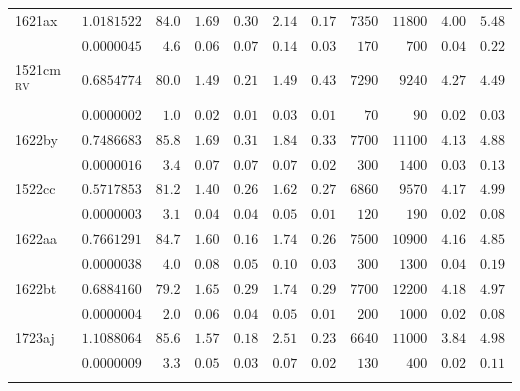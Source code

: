 \begin{table}
\begin{tabular}{@{}l *{10}{r} }
\noalign{\smallskip}
1621ax & $ 1.0181522$  & $      84.0$  & $      1.69$  & $      0.30$  & $      2.14$  & $      0.17$  & $7350$  & $11800$  & $      4.00$  & $      5.48$  \\
 & $ 0.0000045$  & $       4.6$  & $      0.06$  & $      0.07$  & $      0.14$  & $      0.03$  & $170$  & $700$  & $      0.04$  & $      0.22$  \\
\noalign{\smallskip}
1521cm$^\mathrm{RV}$ & $ 0.6854774$  & $      80.0$  & $      1.49$  & $      0.21$  & $      1.49$  & $      0.43$  & $7290$  & $9240$  & $      4.27$  & $      4.49$  \\
 & $ 0.0000002$  & $       1.0$  & $      0.02$  & $      0.01$  & $      0.03$  & $      0.01$  & $70$  & $90$  & $      0.02$  & $      0.03$  \\
\noalign{\smallskip}
1622by & $ 0.7486683$  & $      85.8$  & $      1.69$  & $      0.31$  & $      1.84$  & $      0.33$  & $7700$  & $11100$  & $      4.13$  & $      4.88$  \\
 & $ 0.0000016$  & $       3.4$  & $      0.07$  & $      0.07$  & $      0.07$  & $      0.02$  & $300$  & $1400$  & $      0.03$  & $      0.13$  \\
\noalign{\smallskip}
1522cc & $ 0.5717853$  & $      81.2$  & $      1.40$  & $      0.26$  & $      1.62$  & $      0.27$  & $6860$  & $9570$  & $      4.17$  & $      4.99$  \\
 & $ 0.0000003$  & $       3.1$  & $      0.04$  & $      0.04$  & $      0.05$  & $      0.01$  & $120$  & $190$  & $      0.02$  & $      0.08$  \\
\noalign{\smallskip}
1622aa & $ 0.7661291$  & $      84.7$  & $      1.60$  & $      0.16$  & $      1.74$  & $      0.26$  & $7500$  & $10900$  & $      4.16$  & $      4.85$  \\
 & $ 0.0000038$  & $       4.0$  & $      0.08$  & $      0.05$  & $      0.10$  & $      0.03$  & $300$  & $1300$  & $      0.04$  & $      0.19$  \\
\noalign{\smallskip}
1622bt & $ 0.6884160$  & $      79.2$  & $      1.65$  & $      0.29$  & $      1.74$  & $      0.29$  & $7700$  & $12200$  & $      4.18$  & $      4.97$  \\
 & $ 0.0000004$  & $       2.0$  & $      0.06$  & $      0.04$  & $      0.05$  & $      0.01$  & $200$  & $1000$  & $      0.02$  & $      0.08$  \\
\noalign{\smallskip}
1723aj & $ 1.1088064$  & $      85.6$  & $      1.57$  & $      0.18$  & $      2.51$  & $      0.23$  & $6640$  & $11000$  & $      3.84$  & $      4.98$  \\
 & $ 0.0000009$  & $       3.3$  & $      0.05$  & $      0.03$  & $      0.07$  & $      0.02$  & $130$  & $400$  & $      0.02$  & $      0.11$  \\
\noalign{\smallskip}
\hline
\end{tabular}
\end{table}
